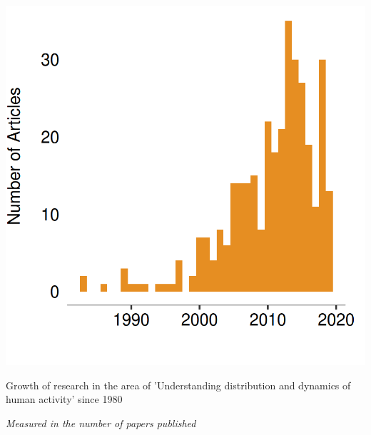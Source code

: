 \begin{marginfigure}
  \includegraphics{images/literature-timeline.png}
  \caption{Growth of research in the area of 'Understanding distribution and dynamics of human activity' since 1980}
  \label{figure:literature:timeline}
  \vspace{1em}
  \noindent\fontsize{7}{7}\textit{Measured in the number of papers published}
\end{marginfigure}

